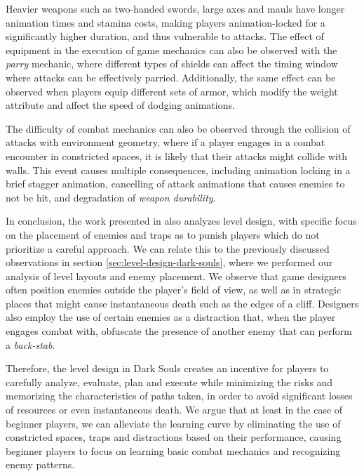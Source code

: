 Heavier weapons such as two-handed swords, large axes and mauls have longer animation times and stamina costs, making players animation-locked for a significantly higher duration, and thus vulnerable to attacks. The effect of equipment in the execution of game mechanics can also be observed with the \emph{parry} mechanic, where different types of shields can affect the timing window where attacks can be effectively parried. Additionally, the same effect can be observed when players equip different sets of armor, which modify the weight attribute and affect the speed of dodging animations.

The difficulty of combat mechanics can also be observed through the collision of attacks with environment geometry, where if a player engages in a combat encounter in constricted spaces, it is likely that their attacks might collide with walls. This event causes multiple consequences, including animation locking in a brief stagger animation, cancelling of attack animations that causes enemies to not be hit, and degradation of \emph{weapon durability}.

In conclusion, the work presented in \citet{YT_DarkSoulsSimpleAI} also analyzes level design, with specific focus on the placement of enemies and traps as to punish players which do not prioritize a careful approach. We can relate this to the previously discussed observations in section \ref{sec:level-design-dark-souls}, where we performed our analysis of level layouts and enemy placement. We observe that game designers often position enemies outside the player's field of view, as well as in strategic places that might cause instantaneous death such as the edges of a cliff. Designers also employ the use of certain enemies as a distraction that, when the player engages combat with, obfuscate the presence of another enemy that can perform a \emph{back-stab}.

Therefore, the level design in Dark Souls creates an incentive for players to carefully analyze, evaluate, plan and execute while minimizing the risks and memorizing the characteristics of paths taken, in order to avoid significant losses of resources or even instantaneous death. We argue that at least in the case of beginner players, we can alleviate the learning curve by eliminating the use of constricted spaces, traps and distractions based on their performance, causing beginner players to focus on learning basic combat mechanics and recognizing enemy patterns.

